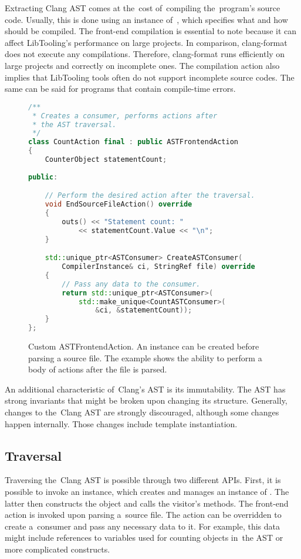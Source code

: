 Extracting Clang AST comes at the~cost of~compiling the~program's
source code. 
Usually, this is done using an instance of~, 
which specifies what and how should be compiled. 
The front-end compilation is essential to note because it can affect 
LibTooling's performance on large projects. 
In comparison, clang-format does not execute any compilations. 
Therefore, clang-format runs efficiently on large projects 
and correctly on incomplete ones. 
The compilation action also implies that LibTooling tools often 
do not support incomplete source codes. 
The same can be said for programs that contain compile-time errors.

\begin{figure}[h]\centering
\begin{lstlisting}[language=C++]
/**
 * Creates a consumer, performs actions after 
 * the AST traversal.
 */
class CountAction final : public ASTFrontendAction
{
	CounterObject statementCount;
	
public:

	// Perform the desired action after the traversal.
	void EndSourceFileAction() override
	{
		outs() << "Statement count: " 
			<< statementCount.Value << "\n";
	}

	std::unique_ptr<ASTConsumer> CreateASTConsumer(
		CompilerInstance& ci, StringRef file) override
	{
		// Pass any data to the consumer.
		return std::unique_ptr<ASTConsumer>(
			std::make_unique<CountASTConsumer>(
				&ci, &statementCount));
	}
};
\end{lstlisting}
\caption{Custom ASTFrontendAction. An instance can be created before
parsing a source file. The example shows the ability to perform
a body of actions after the file is parsed.}
\label{lst:astfrontendaction}
\end{figure}

An additional characteristic of~Clang's AST is its immutability. 
The AST has strong invariants that might be broken upon changing 
its structure. 
Generally, changes to the~Clang AST are strongly discouraged, 
although some changes happen internally. 
Those changes include template instantiation.

\subsection{Traversal}

Traversing the~Clang AST is possible through two different APIs. 
First, it is possible to invoke an  instance, 
which creates and manages an instance of . 
The latter then constructs the  object and 
calls the visitor's methods. 
The front-end action is invoked upon parsing a~source file. 
The action can be overridden to create a~consumer and pass any necessary 
data to it. 
For example, this data might include references to variables used for 
counting objects in~the AST or more complicated constructs. 


